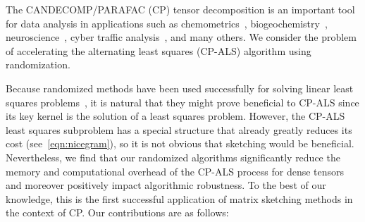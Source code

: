 The CANDECOMP/PARAFAC (CP) tensor decomposition is an important tool
for data analysis in applications such as chemometrics~\cite{MuStGrBr13}, biogeochemistry~\cite{JaCaYa14},
neuroscience~\cite{AcBiBiBr07,DaGiCaWa13,CoLiKuGo15}, cyber traffic analysis~\cite{MaGuFa11}, and many others.
%
We consider the problem of accelerating the alternating least squares (CP-ALS) algorithm using randomization.

Because randomized methods have been used successfully for solving
linear least squares problems~\cite{DrMaMuSa11,blendenpik,sketching}, it is natural that they might prove
beneficial to CP-ALS since its key kernel is the solution of a least
squares problem. However, the CP-ALS least squares subproblem has a
special structure that already greatly reduces its cost (see~\cref{eqn:nicegram}), so it is not obvious that sketching would be beneficial.
Nevertheless, we find that our randomized algorithms significantly reduce the memory and computational overhead of the CP-ALS process for dense tensors and moreover positively impact algorithmic robustness.
To the best of our knowledge, this is the first successful application of matrix sketching methods in the context of CP.
Our contributions are as follows:

